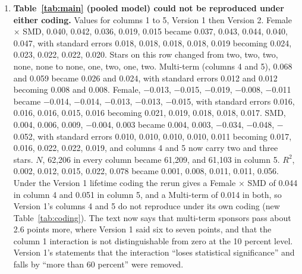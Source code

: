 \documentclass[11pt]{article}
\begin{document}
{\begin{enumerate}
\item \textbf{Table~\ref{tab:main} (pooled model) could not be reproduced under either coding.} Values for columns 1 to 5, Version 1 then Version 2. Female $\times$ SMD, 0.040, 0.042, 0.036, 0.019, 0.015 became 0.037, 0.043, 0.044, 0.040, 0.047, with standard errors 0.018, 0.018, 0.018, 0.018, 0.019 becoming 0.024, 0.023, 0.022, 0.022, 0.020. Stars on this row changed from two, two, two, none, none to none, one, two, one, two. Multi-term (columns 4 and 5), 0.068 and 0.059 became 0.026 and 0.024, with standard errors 0.012 and 0.012 becoming 0.008 and 0.008. Female, $-$0.013, $-$0.015, $-$0.019, $-$0.008, $-$0.011 became $-$0.014, $-$0.014, $-$0.013, $-$0.013, $-$0.015, with standard errors 0.016, 0.016, 0.016, 0.015, 0.016 becoming 0.021, 0.019, 0.018, 0.018, 0.017. SMD, 0.004, 0.006, 0.009, $-$0.004, 0.003 became 0.004, 0.003, $-$0.034, $-$0.048, $-$0.052, with standard errors 0.010, 0.010, 0.010, 0.010, 0.011 becoming 0.017, 0.016, 0.022, 0.022, 0.019, and columns 4 and 5 now carry two and three stars. $N$, 62,206 in every column became 61,209, and 61,103 in column 5. $R^2$, 0.002, 0.012, 0.015, 0.022, 0.078 became 0.001, 0.008, 0.011, 0.011, 0.056. Under the Version 1 lifetime coding the rerun gives a Female $\times$ SMD of 0.044 in column 4 and 0.051 in column 5, and a Multi-term of 0.014 in both, so Version 1's columns 4 and 5 do not reproduce under its own coding (new Table~\ref{tab:coding}). The text now says that multi-term sponsors pass about 2.6 points more, where Version 1 said six to seven points, and that the column 1 interaction is not distinguishable from zero at the 10 percent level. Version 1's statements that the interaction ``loses statistical significance'' and falls by ``more than 60 percent'' were removed.

\end{enumerate}}
\end{document}
